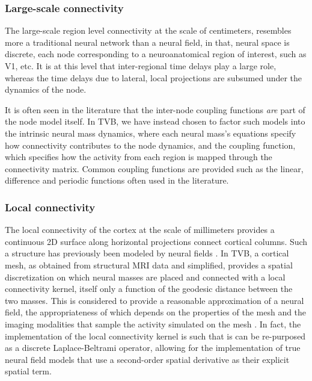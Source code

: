 	\subsubsection{Large-scale connectivity}

	The large-scale region level connectivity at the scale of centimeters,
	resembles more a traditional neural network than a neural field, in that,
	neural space is discrete,  each node corresponding to a neuroanatomical
	region of interest, such as V1, etc. It is at this level that inter-regional 
	time delays play a large role, whereas the time delays due to 
	lateral, local projections are subsumed under the dynamics of the node.

	It is often seen in the literature that the inter-node coupling functions
	\textit{are} part of the node model itself. In TVB, we have instead 
	chosen to factor such models into the intrinsic neural mass dynamics, where each 
	neural mass's equations specify how connectivity contributes to the
	node dynamics, and the coupling function, which specifies how the activity
	from each region is mapped through the connectivity matrix. Common coupling 
	functions are provided such as the linear, difference and periodic functions
	often used in the literature.

	\subsubsection{Local connectivity}

	The local connectivity of the cortex at the scale of millimeters provides
	a continuous 2D surface along horizontal projections connect 
	cortical columns. Such a structure has previously been modeled by
	neural fields \citep{Amari_1977, Jirsa_1997, Liley_1999}. In TVB, a cortical mesh, 
	as obtained from structural MRI data and simplified, provides a spatial 
	discretization on which neural masses are placed and connected with a
	local connectivity kernel, itself only a function of the geodesic distance
	between the two masses. This is considered to provide a reasonable
	approximation of a neural field, the appropriateness of which depends on the properties
	of the mesh and the imaging modalities that sample the activity simulated
	on the mesh \citep{Spiegler_2013}. In fact,
	the implementation of the local connectivity kernel is such
	that is can be re-purposed as a discrete Laplace-Beltrami operator,
	allowing for the implementation of true neural field models that 
	use a second-order spatial derivative as their explicit spatial term.

